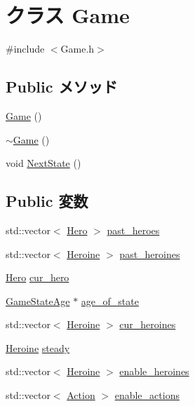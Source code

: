 \hypertarget{class_game}{\section{クラス Game}
\label{class_game}
}


{\ttfamily \#include $<$Game.\-h$>$}

\subsection*{Public メソッド}
\begin{DoxyCompactItemize}
\item 
\hyperlink{class_game_ad59df6562a58a614fda24622d3715b65}{Game} ()
\item 
\hyperlink{class_game_ae3d112ca6e0e55150d2fdbc704474530}{$\sim$\-Game} ()
\item 
void \hyperlink{class_game_a722f2a3f4a066119402192a4e72066fa}{Next\-State} ()
\end{DoxyCompactItemize}
\subsection*{Public 変数}
\begin{DoxyCompactItemize}
\item 
std\-::vector$<$ \hyperlink{class_hero}{Hero} $>$ \hyperlink{class_game_aca4c6b3b301b373c79cfdc83965a8ff0}{past\-\_\-heroes}
\item 
std\-::vector$<$ \hyperlink{class_heroine}{Heroine} $>$ \hyperlink{class_game_a5e0a401f6198f1e917a873b527643210}{past\-\_\-heroines}
\item 
\hyperlink{class_hero}{Hero} \hyperlink{class_game_a4e71d5aa50da2da9e814fb3245c5fd12}{cur\-\_\-hero}
\item 
\hyperlink{class_game_state_age}{Game\-State\-Age} $\ast$ \hyperlink{class_game_a9884a280415f35cb77380b459aa2fca1}{age\-\_\-of\-\_\-state}
\item 
std\-::vector$<$ \hyperlink{class_heroine}{Heroine} $>$ \hyperlink{class_game_a50949f6170d517f879db0b9c40fe563a}{cur\-\_\-heroines}
\item 
\hyperlink{class_heroine}{Heroine} \hyperlink{class_game_af7003a797940ce5edce170e7092529e0}{steady}
\item 
std\-::vector$<$ \hyperlink{class_heroine}{Heroine} $>$ \hyperlink{class_game_a3d20a4c7faf985ccddec4e0758b85dd8}{enable\-\_\-heroines}
\item 
std\-::vector$<$ \hyperlink{class_action}{Action} $>$ \hyperlink{class_game_a64703f92ea3218370a38d65a279bde7c}{enable\-\_\-actions}
\end{DoxyCompactItemize}


